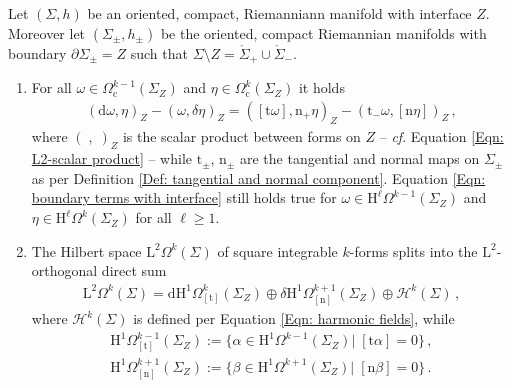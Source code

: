 \begin{theorem}\label{Thm: Hodge decomposition for manifolds with interface}
	Let $(\Sigma,h)$ be an oriented, compact, Riemanniann manifold with interface $Z$.
	Moreover let $(\Sigma_\pm,h_\pm)$ be the oriented, compact Riemannian manifolds with boundary $\partial\Sigma_\pm= Z$ such that $\Sigma\setminus Z=\mathring{\Sigma}_+\cup\mathring{\Sigma}_-$.
	\begin{enumerate}
		\item 
		For all $\omega\in \Omega_\mathrm{c}^{k-1}(\Sigma_Z)$ and $\eta\in \Omega_\mathrm{c}^k(\Sigma_Z)$ it holds
		\begin{align}\label{Eqn: boundary terms with interface}
			(\mathrm{d}\omega,\eta)_Z-(\omega,\delta\eta)_Z=
			([\mathrm{t}\omega],\mathrm{n}_+\eta)_Z-(\mathrm{t}_-\omega,[\mathrm{n}\eta])_Z\,,
		\end{align}
		where $(\;,\;)_Z$ is the scalar product between forms on $Z$ -- \textit{cf}. Equation \eqref{Eqn: L2-scalar product} -- while $\mathrm{t}_\pm$, $\mathrm{n}_\pm$ are the tangential and normal maps on $\Sigma_\pm$ as per Definition \ref{Def: tangential and normal component}.
		Equation \eqref{Eqn: boundary terms with interface} still holds true for $\omega\in \mathrm{H}^\ell\Omega^{k-1}(\Sigma_Z)$ and $\eta\in \mathrm{H}^\ell\Omega^k(\Sigma_Z)$ for all $\ell\geq 1$.
		\item
		The Hilbert space $\mathrm{L}^2\Omega^k(\Sigma)$ of square integrable $k$-forms splits into the $\mathrm{L}^2$-orthogonal direct sum
		\begin{align}\label{Eqn: Hodge decomposition for manifold with interface}
			\mathrm{L}^2\Omega^k(\Sigma)=
			\mathrm{d} \mathrm{H}^1\Omega^k_{[\mathrm{t}]}(\Sigma_Z)\oplus
			\delta \mathrm{H}^1\Omega^{k+1}_{[\mathrm{n}]}(\Sigma_Z)\oplus\mathcal{H}^k(\Sigma)\,,		
		\end{align}
	where $\mathcal{H}^k(\Sigma)$ is defined per Equation \eqref{Eqn: harmonic fields}, while
		\begin{align}\label{Eqn: Dirichlet and Neumann jump forms}
			\mathrm{H}^1\Omega^{k-1}_{[\mathrm{t}]}(\Sigma_Z):=\lbrace\alpha\in \mathrm{H}^1\Omega^{k-1}(\Sigma_Z)|\;[\mathrm{t}\alpha]=0\rbrace\,,\\
			\mathrm{H}^1\Omega^{k+1}_{[\mathrm{n}]}(\Sigma_Z):=\lbrace\beta\in \mathrm{H}^1\Omega^{k+1}(\Sigma_Z)|\;[\mathrm{n}\beta]=0\rbrace\,.
		\end{align}
	\end{enumerate}
\end{theorem}
